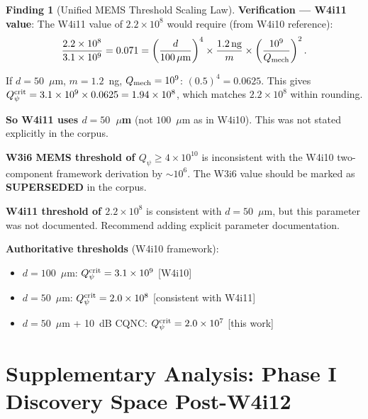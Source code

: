 \documentclass[11pt]{article}
\newcommand{\ee}[1]{\times 10^{#1}}
\newcommand{\Qpsi}{Q_\psi}
\theoremstyle{definition}
\newtheorem{finding}[theorem]{Finding}
\theoremstyle{remark}
\begin{document}
\begin{finding}[Unified MEMS Threshold Scaling Law]
\textbf{Verification --- W4i11 value}: The W4i11 value of $2.2\ee{8}$
would require (from W4i10 reference):
\begin{equation}
\frac{2.2\ee{8}}{3.1\ee{9}} = 0.071 = \left(\frac{d}{100\,\mu\text{m}}\right)^4
\times\frac{1.2\,\text{ng}}{m}\times\left(\frac{10^9}{Q_{\rm mech}}\right)^2.
\end{equation}

If $d = 50$~$\mu$m, $m = 1.2$~ng, $Q_{\rm mech} = 10^9$:
$(0.5)^4 = 0.0625$. This gives $\Qpsi^{\rm crit} = 3.1\ee{9}\times 0.0625
= 1.94\ee{8}$, which matches $2.2\ee{8}$ within rounding.

\textbf{So W4i11 uses $d = 50$~$\mu$m} (not $100$~$\mu$m as in W4i10).
This was not stated explicitly in the corpus.

\begin{tcolorbox}[colback=red!5!white, colframe=red!60!black,
  title=\textbf{CORPUS INCONSISTENCY FLAGGED}]
\textbf{W3i6 MEMS threshold of $\Qpsi \geq 4\ee{10}$} is inconsistent
with the W4i10 two-component framework derivation by $\sim 10^6$. The
W3i6 value should be marked as \textbf{SUPERSEDED} in the corpus.

\textbf{W4i11 threshold of $2.2\ee{8}$} is consistent with $d = 50$~$\mu$m,
but this parameter was not documented. Recommend adding explicit
parameter documentation.

\textbf{Authoritative thresholds} (W4i10 framework):
\begin{itemize}[nosep]
\item $d = 100$~$\mu$m: $\Qpsi^{\rm crit} = 3.1\ee{9}$ [W4i10]
\item $d = 50$~$\mu$m: $\Qpsi^{\rm crit} = 2.0\ee{8}$ [consistent with W4i11]
\item $d = 50$~$\mu$m + 10~dB CQNC: $\Qpsi^{\rm crit} = 2.0\ee{7}$ [this work]
\end{itemize}
\end{tcolorbox}
\end{finding}


\part{Supplementary Analysis: Phase I Discovery Space Post-W4i12}
\label{part:discovery}
\end{document}
